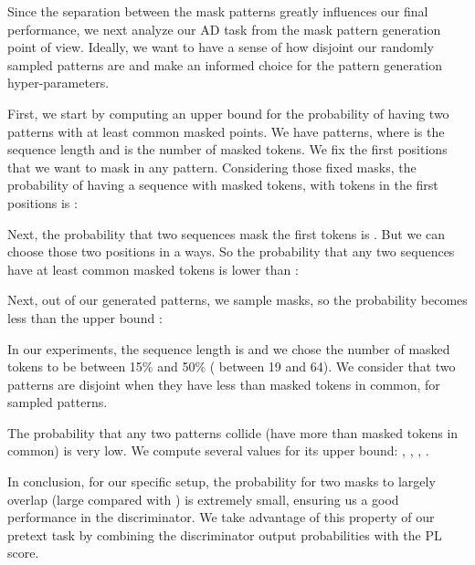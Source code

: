 \documentclass[11pt]{article}
\begin{document}
Since the separation between the mask patterns greatly influences our final performance, we next analyze our AD task from the mask pattern generation point of view. Ideally, we want to have a sense of how disjoint our randomly sampled patterns are and make an informed choice for the pattern generation hyper-parameters.

First, we start by computing an upper bound for the probability of having two patterns with at least  common masked points. We have  patterns, where  is the sequence length and  is the number of masked tokens. We fix the first  positions that we want to mask in any pattern. Considering those fixed masks, the probability of having a sequence with  masked tokens, with  tokens in the first positions is :



Next, the probability that two sequences mask the first  tokens is . But we can choose those two positions in a  ways. So the probability that any two sequences have at least  common masked tokens is lower than :



Next, out of our generated patterns, we sample  masks, so the probability becomes less than the upper bound :




In our experiments, the sequence length is  and we chose the number of masked tokens to be between 15\% and 50\% ( between 19 and 64). We consider that two patterns are disjoint when they have less than  masked tokens in common, for  sampled patterns.


The probability that any two patterns collide (have more than  masked tokens in common) is very low. We compute several values for its upper bound: , , , .

In conclusion, for our specific setup, the probability for two masks to largely overlap (large  compared with ) is extremely small, ensuring us a good performance in the discriminator. We take advantage of this property of our pretext task by combining the discriminator output probabilities with the PL score.
\end{document}
